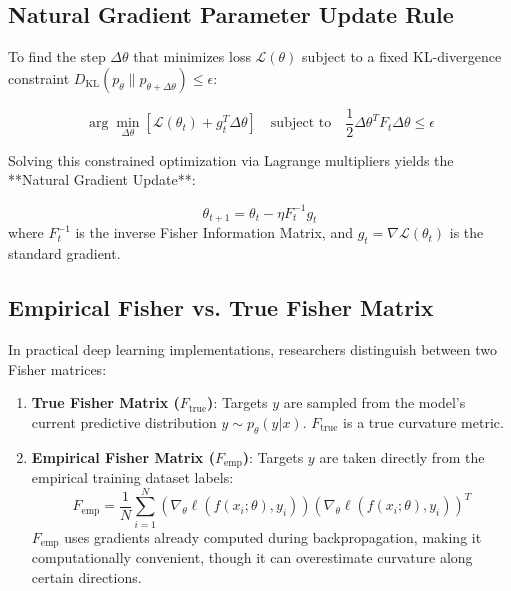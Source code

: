 \subsection{Natural Gradient Parameter Update Rule}
To find the step $\Delta \theta$ that minimizes loss $\mathcal{L}(\theta)$ subject to a fixed KL-divergence constraint $D_{\text{KL}}(p_\theta \| p_{\theta + \Delta \theta}) \le \epsilon$:

\begin{equation}
\arg\min_{\Delta \theta} \left[ \mathcal{L}(\theta_t) + g_t^T \Delta \theta \right] \quad \text{subject to} \quad \frac{1}{2} \Delta \theta^T F_t \Delta \theta \le \epsilon
\end{equation}

Solving this constrained optimization via Lagrange multipliers yields the **Natural Gradient Update**:

\begin{mathbox}
\begin{equation}
\theta_{t+1} = \theta_t - \eta F_t^{-1} g_t
\end{equation}
where $F_t^{-1}$ is the inverse Fisher Information Matrix, and $g_t = \nabla \mathcal{L}(\theta_t)$ is the standard gradient.
\end{mathbox}

\subsection{Empirical Fisher vs. True Fisher Matrix}
In practical deep learning implementations, researchers distinguish between two Fisher matrices:
\begin{enumerate}[leftmargin=*]
    \item \textbf{True Fisher Matrix ($F_{\text{true}}$)}: Targets $y$ are sampled from the model's current predictive distribution $y \sim p_\theta(y|x)$. $F_{\text{true}}$ is a true curvature metric.
    \item \textbf{Empirical Fisher Matrix ($F_{\text{emp}}$)}: Targets $y$ are taken directly from the empirical training dataset labels:
    \begin{equation}
    F_{\text{emp}} = \frac{1}{N} \sum_{i=1}^N \left( \nabla_\theta \ell(f(x_i; \theta), y_i) \right) \left( \nabla_\theta \ell(f(x_i; \theta), y_i) \right)^T
    \end{equation}
    $F_{\text{emp}}$ uses gradients already computed during backpropagation, making it computationally convenient, though it can overestimate curvature along certain directions.
\end{enumerate}



